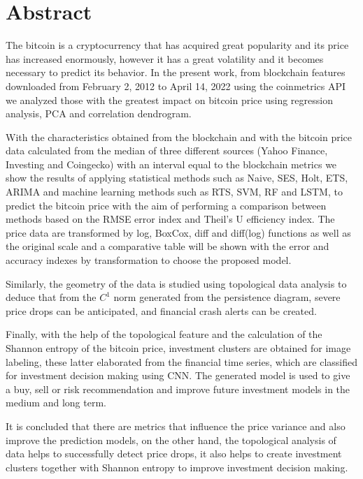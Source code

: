 \chapter*{Abstract}

The bitcoin is a cryptocurrency that has acquired great popularity and its price has increased enormously, however it has a great volatility and it becomes necessary to predict its behavior. In the present work, from blockchain features downloaded from February 2, 2012 to April 14, 2022 using the coinmetrics API we analyzed those with the greatest impact on bitcoin price using regression analysis, PCA and correlation dendrogram.

With the characteristics obtained from the blockchain and with the bitcoin price data calculated from the median of three different sources (Yahoo Finance, Investing and Coingecko) with an interval equal to the blockchain metrics we show the results of applying statistical methods such as Naive, SES, Holt, ETS, ARIMA and machine learning methods such as RTS, SVM, RF and LSTM, to predict the bitcoin price with the aim of performing a comparison between methods based on the RMSE error index and Theil's U efficiency index. The price data are transformed by log, BoxCox, diff and diff(log) functions as well as the original scale and a comparative table will be shown with the error and accuracy indexes by transformation to choose the proposed model.

Similarly, the geometry of the data is studied using topological data analysis to deduce that from the $C^1$ norm generated from the persistence diagram, severe price drops can be anticipated, and financial crash alerts can be created.

Finally, with the help of the topological feature and the calculation of the Shannon entropy of the bitcoin price, investment clusters are obtained for image labeling, these latter elaborated from the financial time series, which are classified for investment decision making using CNN. The generated model is used to give a buy, sell or risk recommendation and improve future investment models in the medium and long term.

It is concluded that there are metrics that influence the price variance and also improve the prediction models, on the other hand, the topological analysis of data helps to successfully detect price drops, it also helps to create investment clusters together with Shannon entropy to improve investment decision making.








